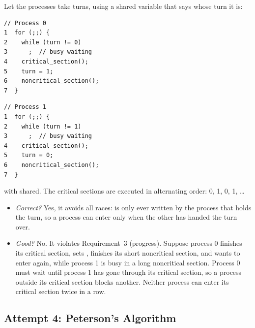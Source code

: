 Let the processes take turns, using a shared variable  that says whose turn it is:
\begin{center}
\begin{minipage}[t]{0.45\textwidth}
\begin{lstlisting}
// Process 0
1  for (;;) {
2    while (turn != 0)
3      ;  // busy waiting
4    critical_section();
5    turn = 1;
6    noncritical_section();
7  }
\end{lstlisting}
\end{minipage}\hfill
\begin{minipage}[t]{0.45\textwidth}
\begin{lstlisting}
// Process 1
1  for (;;) {
2    while (turn != 1)
3      ;  // busy waiting
4    critical_section();
5    turn = 0;
6    noncritical_section();
7  }
\end{lstlisting}
\end{minipage}
\end{center}
with  shared. The critical sections are executed in alternating order: 0, 1, 0, 1, \dots
\begin{itemize}
  \item \emph{Correct?} Yes, it avoids all races:  is only ever written by the process that holds the turn, so a process can enter only when the other has handed the turn over.
  \item \emph{Good?} No. It violates Requirement~3 (progress). Suppose process 0 finishes its critical section, sets , finishes its short noncritical section, and wants to enter again, while process 1 is busy in a long noncritical section. Process 0 must wait until process 1 has gone through its critical section, so a process outside its critical section blocks another. Neither process can enter its critical section twice in a row.
\end{itemize}

\subsection{Attempt 4: Peterson's Algorithm}

